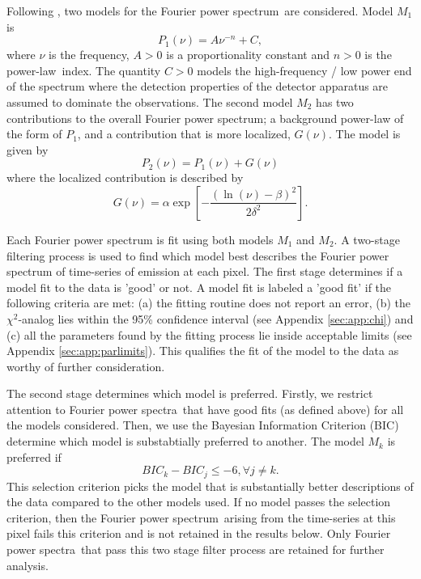 \documentclass[onecolumn]{emulateapj}
\newcommand{\PS}{power spectrum}
\newcommand{\PA}{power spectra}
\newcommand{\PL}{power-law}
\newcommand{\Fps}{Fourier \PS}
\newcommand{\Fpa}{Fourier \PA}
\begin{document}
Following \citet{ireland2015}, two models for the \Fps\ are
considered. Model $M_{1}$ is
\begin{equation}
\label{eqn:pwrlaw}
P_{1}(\nu) = A\nu^{-n} + C,
\end{equation}
where $\nu$ is the frequency, $A>0$ is a proportionality constant and
$n>0$ is the \PL\ index.  The quantity $C>0$ models the high-frequency
/ low power end of the spectrum where the detection properties of the
detector apparatus are assumed to dominate the observations. The
second model $M_{2}$ has two contributions to the overall \Fps; a
background power-law of the form of $P_{1}$, and a contribution that
is more localized, $G(\nu)$.  The model is given by
\begin{equation}
\label{eqn:pwrlawbump}
P_{2}(\nu) = P_{1}(\nu) + G(\nu)
\end{equation}
where the localized contribution is described by
\begin{equation}
\label{eqn:bump}
G(\nu) = \alpha\exp\left[-\frac{(\ln(\nu)-\beta)^{2}}{2\delta^{2}}\right].
\end{equation}

Each Fourier power spectrum is fit using both models $M_{1}$ and
$M_{2}$.  A two-stage filtering process is used to find which model
best describes the Fourier power spectrum of time-series of emission
at each pixel.  The first stage determines if a model fit to the data
is 'good' or not.  A model fit is labeled a 'good fit' if the
following criteria are met: (a) the fitting routine does not report an
error, (b) the $\chi^{2}$-analog lies within the 95\% confidence
interval (see Appendix \ref{sec:app:chi}) and (c) all the parameters
found by the fitting process lie inside acceptable limits (see
Appendix \ref{sec:app:parlimits}).  This qualifies the fit of the
model to the data as worthy of further consideration.

The second stage determines which model is preferred.  Firstly, we
restrict attention to \Fpa\ that have good fits (as defined above) for
all the models considered.  Then, we use the Bayesian Information
Criterion (BIC) determine which model is substabtially preferred to
another.  The model $M_{k}$ is preferred if
\begin{equation}
\label{eqn:bic}
BIC_{k} - BIC_{j} \le -6, \forall j \neq k.
\end{equation}
This selection criterion picks the model that is substantially better
descriptions of the data compared to the other models used.  If no
model passes the selection criterion, then the \Fps\ arising from the
time-series at this pixel fails this criterion and is not retained in
the results below.  Only \Fpa\ that pass this two stage filter process
are retained for further analysis.
\end{document}
